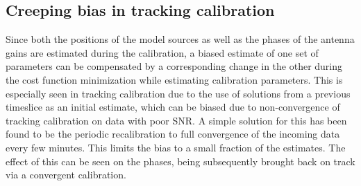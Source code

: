 \documentclass{aa}
\begin{document}
\subsection{Creeping bias in tracking calibration}

Since both  the positions  of the  model sources as  well as  the phases  of the
antenna gains are estimated during the calibration, a biased estimate of one set
of  parameters can  be  compensated by  a corresponding change in the  other during the cost function minimization while estimating calibration parameters. This  is
especially  seen in  tracking calibration  due to  the use  of solutions  from a
previous  timeslice  as  an  initial  estimate,  which  can  be  biased  due  to
non-convergence of tracking  calibration on data with  poor SNR.  A simple solution for this has  been found to be
the periodic  recalibration to full convergence  of the incoming  data every few
minutes. This limits the bias to a small fraction of the estimates.   The effect  of this  can  be seen  on the  phases, being  subsequently
brought back on track via a convergent calibration.






\end{document}
